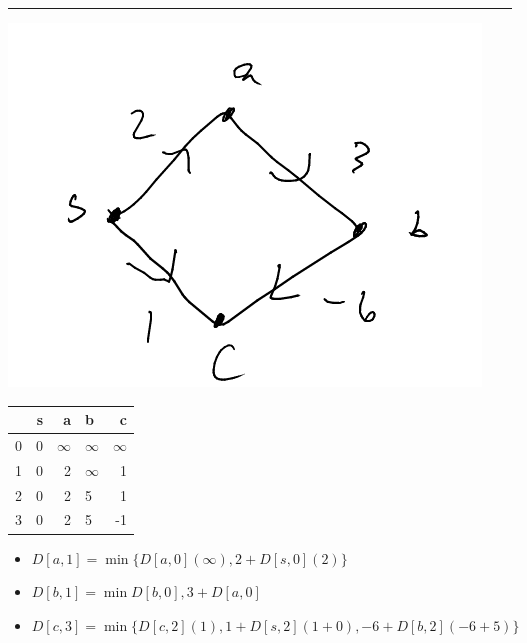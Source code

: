 \documentclass[11pt]{article}
\begin{document}
\noindent\rule{\textwidth}{0.5pt}
\begin{center}
\includegraphics[width=.9\linewidth]{./Images/i99.png}
\end{center}
\begin{center}
\begin{tabular}{rrrlr}
 & s & a & b & c\\
\hline
0 & 0 & \(\infty\) & \(\infty\) & \(\infty\)\\
1 & 0 & 2 & \(\infty\) & 1\\
2 & 0 & 2 & 5 & 1\\
3 & 0 & 2 & 5 & -1\\
\end{tabular}
\end{center}
\begin{itemize}
\item \(D[a,1]=\min\{D[a,0] (\infty), 2+D[s,0] (2)\}\)
\item \(D[b,1]=\min{D[b,0],3+D[a,0]}\)
\item \(D[c,3]=\min \{D[c,2] (1), 1+D[s,2] (1+0), -6+D[b,2] (-6+5)\}\)
\end{itemize}
\end{document}
